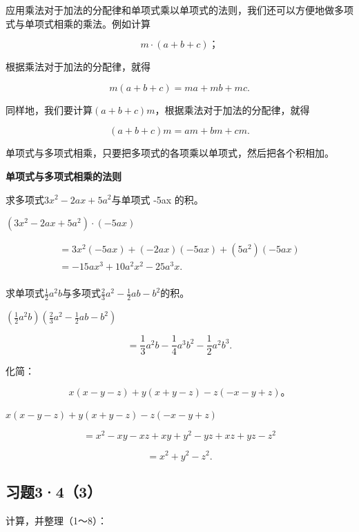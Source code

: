 应用乘法对于加法的分配律和单项式乘以单项式的法则，我们还可以方便地做多项式与单项式相乘的乘法。例如计算

\[
m \cdot (a + b + c)\text{；}
\]

根据乘法对于加法的分配律，就得

\[
m (a + b + c) = m a + m b + m c.
\]

同样地，我们要计算\((a + b + c)m\)，根据乘法对于加法的分配律，就得

\[
(a + b + c) m = a m + b m + c m.
\]

单项式与多项式相乘，只要把多项式的各项乘以单项式，然后把各个积相加。

\textbf{单项式与多项式相乘的法则}

 求多项式\(3x^{2}-2ax+5a^{2}\)与单项式 -5ax 的积。

\((3x^{2} - 2ax + 5a^{2})\cdot (-5ax)\)

\[
\begin{array}{l} = 3 x ^{2} (- 5 a x) + (- 2 a x) (- 5 a x) + (5 a ^{2}) (- 5 a x) \\ = - 15 a x ^{3} + 10 a ^{2} x ^{2} - 25 a ^{3} x. \\ \end{array}
\]

求单项式\(\frac{1}{2} a^2 b\)与多项式\(\frac{2}{3} a^2 - \frac{1}{2} ab - b^2\)的积。

\(\left(\frac{1}{2} a^2 b\right)\left(\frac{2}{3} a^2 -\frac{1}{2} ab - b^2\right)\)

\[
= \frac{1}{3} a ^{2} b - \frac{1}{4} a ^{3} b ^{2} - \frac{1}{2} a ^{2} b ^{3}.
\]

 化简：

\[
x (x - y - z) + y (x + y - z) - z (- x - y + z)\text{。}
\]

\(x(x - y - z) + y(x + y - z) - z(-x - y + z)\)

\[
= x ^{2} - x y - x z + x y + y ^{2} - y z + x z + y z - z ^{2}
\]

\[
= x ^{2} + y ^{2} - z ^{2}.
\]

\subsection{习题3·4（3）}

计算，并整理（1～8）：

